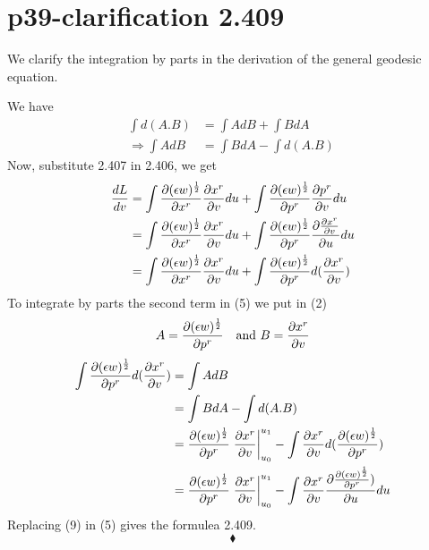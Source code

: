 \section{p39-clarification 2.409}

\begin{tcolorbox}
We clarify the integration by parts in the derivation of the general  geodesic equation.
\end{tcolorbox}
We have 
\begin{align}
\int d(A.B) &= \int AdB + \int BdA\\
\Rightarrow  \int AdB &= \int BdA -  \int d(A.B)\
\end{align}
Now, substitute 2.407 in 2.406, we get
\begin{align}
\dv{L}{v} &= \int \pdv{(\epsilon w)^{\frac{1}{2}}}{x^r} \pdv{x^r}{v} du +  \int \pdv{(\epsilon w)^{\frac{1}{2}}}{p^r} \pdv{p^r}{v} du\\
\ &= \int \pdv{(\epsilon w)^{\frac{1}{2}}}{x^r} \pdv{x^r}{v} du +  \int \pdv{(\epsilon w)^{\frac{1}{2}}}{p^r} \pdv{\pdv{x^r}{v}}{u} du\\
&= \int \pdv{(\epsilon w)^{\frac{1}{2}}}{x^r} \pdv{x^r}{v} du +  \int \pdv{(\epsilon w)^{\frac{1}{2}}}{p^r} d(\pdv{x^r}{v})
\end{align}
To integrate by parts the second term in (5) we put in (2)
$$A= \pdv{(\epsilon w)^{\frac{1}{2}}}{p^r} \quad \text{and } B = \pdv{x^r}{v}$$
\begin{align}
\int \pdv{(\epsilon w)^{\frac{1}{2}}}{p^r} d(\pdv{x^r}{v}) &= \int AdB \\
\ & = \int BdA -  \int d(A.B)\\
\ &= \pdv{(\epsilon w)^{\frac{1}{2}}}{p^r}\left.\pdv{x^r}{v}\right|_{u_0}^{u_1} - \int \pdv{x^r}{v}d(\pdv{(\epsilon w)^{\frac{1}{2}}}{p^r} )\\
\ &= \pdv{(\epsilon w)^{\frac{1}{2}}}{p^r}\left.\pdv{x^r}{v}\right|_{u_0}^{u_1} - \int \pdv{x^r}{v}\pdv{\pdv{(\epsilon w)^{\frac{1}{2}}}{p^r} )}{u}du
\end{align}
Replacing (9) in (5) gives the formulea 2.409.
$$\blacklozenge$$
\newpage

